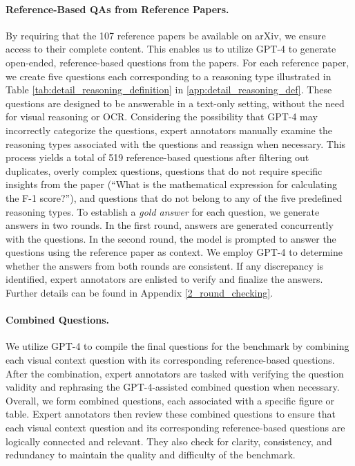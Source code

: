 \paragraph{Reference-Based QAs from Reference Papers.} 
By requiring that the 107 reference papers be available on arXiv, we ensure access to their complete content.
%
This enables us to utilize GPT-4 to generate open-ended, reference-based questions from the papers.
%
For each reference paper, we create five questions each corresponding to a reasoning type illustrated in Table \ref{tab:detail_reasoning_definition} in \ref{app:detail_reasoning_def}. 
%
These questions are designed to be answerable in a text-only setting, without the need for visual reasoning or OCR. 
%
Considering the possibility that GPT-4 may incorrectly categorize the questions, expert annotators manually examine the reasoning types associated with the questions and reassign when necessary. 
%
This process yields a total of 519 reference-based questions after filtering out duplicates, overly complex questions, questions that do not require specific insights from the paper (\eg ``What is the mathematical expression for calculating the F-1 score?''), and questions that do not belong to any of the five predefined reasoning types.
To establish a \emph{gold answer} for each question, we generate answers in two rounds. 
%
In the first round, answers are generated concurrently with the questions. 
%
In the second round, the model is prompted to answer the questions using the reference paper as context. 
%
We employ GPT-4 to determine whether the answers from both rounds are consistent. 
%
If any discrepancy is identified, expert annotators are enlisted to verify and finalize the answers. 
%
Further details can be found in Appendix \ref{2_round_checking}.


\paragraph{Combined Questions.} 
%
We utilize GPT-4 to compile the final questions for the benchmark by combining each visual context question with its corresponding reference-based questions. 
%
After the combination, expert annotators are tasked with verifying the question validity and rephrasing the GPT-4-assisted combined question when necessary.
%
Overall, we form \datanum combined questions, each associated with a specific figure or table. 
%
Expert annotators then review these combined questions to ensure that each visual context question and its corresponding reference-based questions are logically connected and relevant. 
%
They also check for clarity, consistency, and redundancy to maintain the quality and difficulty of the benchmark.



